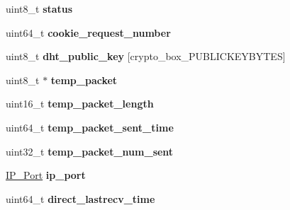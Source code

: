 \begin{DoxyCompactItemize}
\item 
\hypertarget{struct_crypto___connection_ade818037fd6c985038ff29656089758d}{uint8\+\_\+t {\bfseries status}}\label{struct_crypto___connection_ade818037fd6c985038ff29656089758d}

\item 
\hypertarget{struct_crypto___connection_acb77d5443961bf245b63c17347b1b030}{uint64\+\_\+t {\bfseries cookie\+\_\+request\+\_\+number}}\label{struct_crypto___connection_acb77d5443961bf245b63c17347b1b030}

\item 
\hypertarget{struct_crypto___connection_ab2ecaa07625ad0ed5e07d3a1f0dcc939}{uint8\+\_\+t {\bfseries dht\+\_\+public\+\_\+key} \mbox{[}crypto\+\_\+box\+\_\+\+P\+U\+B\+L\+I\+C\+K\+E\+Y\+B\+Y\+T\+E\+S\mbox{]}}\label{struct_crypto___connection_ab2ecaa07625ad0ed5e07d3a1f0dcc939}

\item 
\hypertarget{struct_crypto___connection_a360adb14f743065d5c69fe29a00a06a7}{uint8\+\_\+t $\ast$ {\bfseries temp\+\_\+packet}}\label{struct_crypto___connection_a360adb14f743065d5c69fe29a00a06a7}

\item 
\hypertarget{struct_crypto___connection_a4ef842580c6c073f36578d0e07551cc4}{uint16\+\_\+t {\bfseries temp\+\_\+packet\+\_\+length}}\label{struct_crypto___connection_a4ef842580c6c073f36578d0e07551cc4}

\item 
\hypertarget{struct_crypto___connection_abb5fdaef769d667f90bc97bd72d765d6}{uint64\+\_\+t {\bfseries temp\+\_\+packet\+\_\+sent\+\_\+time}}\label{struct_crypto___connection_abb5fdaef769d667f90bc97bd72d765d6}

\item 
\hypertarget{struct_crypto___connection_a7386b7ad7bedb9dd47d898f588b4f463}{uint32\+\_\+t {\bfseries temp\+\_\+packet\+\_\+num\+\_\+sent}}\label{struct_crypto___connection_a7386b7ad7bedb9dd47d898f588b4f463}

\item 
\hypertarget{struct_crypto___connection_a86e2a5a56c0dd22df6e8b8a10e40f9e4}{\hyperlink{struct_i_p___port}{I\+P\+\_\+\+Port} {\bfseries ip\+\_\+port}}\label{struct_crypto___connection_a86e2a5a56c0dd22df6e8b8a10e40f9e4}

\item 
\hypertarget{struct_crypto___connection_ac6eb8a274b0dedea83359f2d9269cbc2}{uint64\+\_\+t {\bfseries direct\+\_\+lastrecv\+\_\+time}}\label{struct_crypto___connection_ac6eb8a274b0dedea83359f2d9269cbc2}


\end{DoxyCompactItemize}
